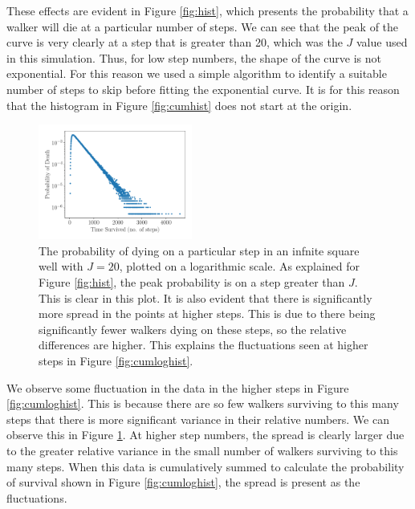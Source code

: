 \documentclass[journal]{IEEEtran}
\begin{document}
These effects are evident in Figure \ref{fig:hist}, which presents the
probability that a walker will die at a particular number of steps. We can see
that the peak of the curve is very clearly at a step that is greater than 20,
which was the $J$ value used in this simulation. Thus, for low step numbers, the
shape of the curve is not exponential. For this reason we used a simple
algorithm to identify a suitable number of steps to skip before fitting the
exponential curve. It is for this reason that the histogram in Figure
\ref{fig:cumhist} does not start at the origin.


\begin{figure}%
  \begin{center}
    \includegraphics[width=0.45\textwidth]{images/line_plot.pdf}
    \caption{The probability of dying on a particular step in an infnite square
      well with $J=20$, plotted on a logarithmic scale. As explained for Figure
      \ref{fig:hist}, the peak probability is on a step greater than $J$. This
      is clear in this plot. It is also evident that there is significantly more
      spread in the points at higher steps. This is due to there being
      significantly fewer walkers dying on these steps, so the relative
      differences are higher. This explains the fluctuations seen at higher
      steps in Figure \ref{fig:cumloghist}.}
    \label{fig:loghist}
  \end{center}
\end{figure}

We observe some fluctuation in the data in the higher steps in Figure
\ref{fig:cumloghist}. This is because there are so few walkers surviving to this
many steps that there is more significant variance in their relative numbers. We
can observe this in Figure \ref{fig:loghist}. At higher step numbers, the spread
is clearly larger due to the greater relative variance in the small number of
walkers surviving to this many steps. When this data is cumulatively summed to
calculate the probability of survival shown in Figure \ref{fig:cumloghist}, the
spread is present as the fluctuations.
\end{document}
